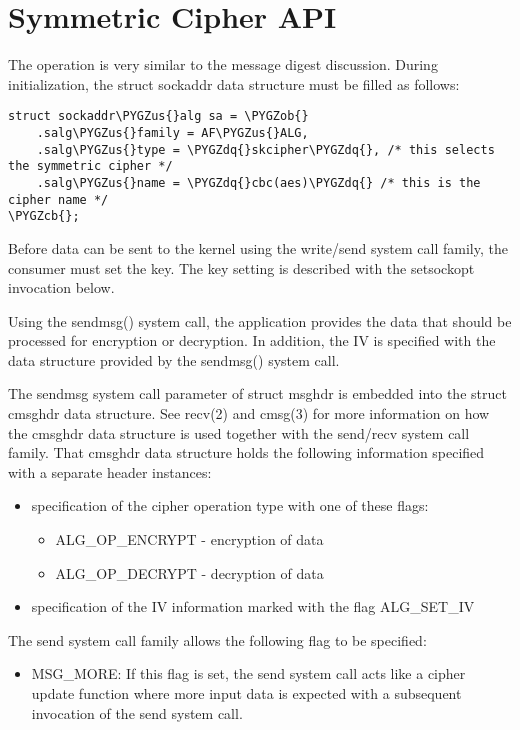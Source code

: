 \documentclass[a4paper,8pt,english]{sphinxmanual}
\def\PYGZus{\char`\_}
\def\PYGZob{\char`\{}
\def\PYGZcb{\char`\}}
\def\PYGZdq{\char`\"}
\begin{document}
\section{Symmetric Cipher API}
\label{crypto/userspace-if:symmetric-cipher-api}
The operation is very similar to the message digest discussion. During
initialization, the struct sockaddr data structure must be filled as
follows:

\begin{Verbatim}[commandchars=\\\{\}]
struct sockaddr\PYGZus{}alg sa = \PYGZob{}
    .salg\PYGZus{}family = AF\PYGZus{}ALG,
    .salg\PYGZus{}type = \PYGZdq{}skcipher\PYGZdq{}, /* this selects the symmetric cipher */
    .salg\PYGZus{}name = \PYGZdq{}cbc(aes)\PYGZdq{} /* this is the cipher name */
\PYGZcb{};
\end{Verbatim}

Before data can be sent to the kernel using the write/send system call
family, the consumer must set the key. The key setting is described with
the setsockopt invocation below.

Using the sendmsg() system call, the application provides the data that
should be processed for encryption or decryption. In addition, the IV is
specified with the data structure provided by the sendmsg() system call.

The sendmsg system call parameter of struct msghdr is embedded into the
struct cmsghdr data structure. See recv(2) and cmsg(3) for more
information on how the cmsghdr data structure is used together with the
send/recv system call family. That cmsghdr data structure holds the
following information specified with a separate header instances:
\begin{itemize}
\item {} 
specification of the cipher operation type with one of these flags:
\begin{itemize}
\item {} 
ALG\_OP\_ENCRYPT - encryption of data

\item {} 
ALG\_OP\_DECRYPT - decryption of data

\end{itemize}

\item {} 
specification of the IV information marked with the flag ALG\_SET\_IV

\end{itemize}

The send system call family allows the following flag to be specified:
\begin{itemize}
\item {} 
MSG\_MORE: If this flag is set, the send system call acts like a
cipher update function where more input data is expected with a
subsequent invocation of the send system call.

\end{itemize}
\end{document}
